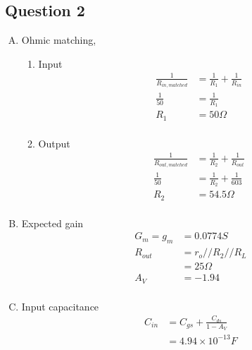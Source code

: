 \documentclass{article}
\begin{document}
\subsection{Question 2}
\label{sec:org6626724}
\begin{enumerate}[A.]
\item Ohmic matching,
\begin{enumerate}[1]
\item Input
\begin{equation*}
\begin{aligned}
\frac{1}{R_{in,matched}} &= \frac{1}{R_{1}} + \frac{1}{R_{in}} \\
\frac{1}{50} &= \frac{1}{R_{1}} \\
R_{1} &= 50 \Omega \\
\end{aligned}
\end{equation*}

\item Output
\begin{equation*}
\begin{aligned}
\frac{1}{R_{out,matched}} &= \frac{1}{R_{2}} + \frac{1}{R_{out}} \\
\frac{1}{50} &= \frac{1}{R_{2}} + \frac{1}{603} \\
R_{2} &= 54.5 \Omega \\
\end{aligned}
\end{equation*}
\end{enumerate}

\item Expected gain
\begin{equation*}
\begin{aligned}
G_{m} = g_{m} &= 0.0774 S \\
R_{out} &= r_{o} // R_{2} // R_{L} \\
&= 25 \Omega \\
A_{V} &= -1.94 \\
\end{aligned}
\end{equation*}

\item Input capacitance
\begin{equation*}
\begin{aligned}
C_{in} &= C_{gs} + \frac{C_{ds}}{1-A_{V}} \\
&= 4.94 \times 10^{-13} F \\
\end{aligned}
\end{equation*}


\end{enumerate}
\end{document}
